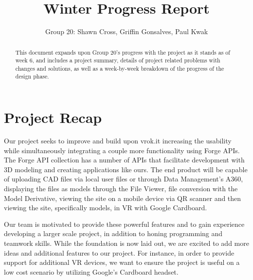 \documentclass[10pt,draftclsnofoot,onecolumn]{IEEEtran}
\begin{document}
\title{Winter Progress Report}
\author{Group 20: Shawn Cross, Griffin Gonsalves, Paul Kwak}
\maketitle
\hspace*{\fill}\hspace*{\fill}
\vspace{2cm}
\begin{abstract}
This document expands upon Group 20's progress with the project as it stands as of week 6, and includes a project summary, details of project related problems with changes and solutions, as well as a week-by-week breakdown of the progress of the design phase. 
\end{abstract}
\IEEEpeerreviewmaketitle

\newpage
{}

\section{Project Recap}
Our project seeks to improve and build upon vrok.it increasing the usability while simultaneously integrating a couple more functionality using Forge APIs. The Forge API collection has a number of APIs that facilitate development with 3D modeling and creating applications like ours. The end product will be capable of uploading CAD files via local user files or through Data Management’s A360, displaying the files as models through the File Viewer, file conversion with the Model Derivative, viewing the site on a mobile device via QR scanner and then viewing the site, specifically models, in VR with Google Cardboard.

Our team is motivated to provide these powerful features and to gain experience developing a larger scale project, in addition to honing programming and teamwork skills. While the foundation is now laid out, we are excited to add more ideas and additional features to our project. For instance, in order to provide support for additional VR devices, we want to ensure the project is useful on a low cost scenario by utilizing Google's Cardboard headset.
\end{document}

